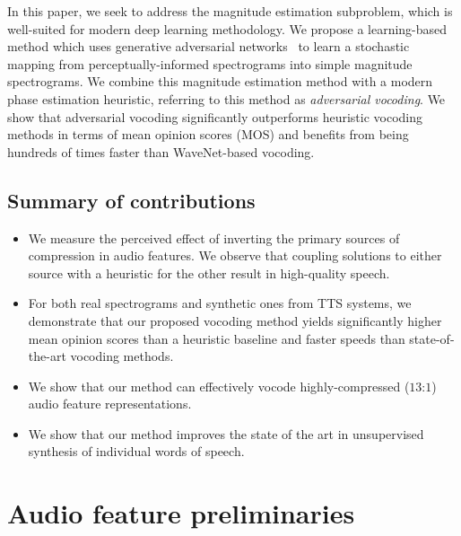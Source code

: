 \documentclass[a4paper]{article}
\begin{document}
In this paper, 
we seek to address the magnitude estimation subproblem, 
which is well-suited for modern deep learning methodology. 
We propose a learning-based method which uses generative adversarial networks~\cite{goodfellow2014generative} to learn a stochastic mapping from perceptually-informed spectrograms into simple magnitude spectrograms. 
We combine this magnitude estimation method with a modern phase estimation heuristic, 
referring to this method as \emph{adversarial vocoding}.
We show that adversarial vocoding significantly outperforms heuristic vocoding methods in terms of mean opinion scores (MOS) and benefits from being hundreds of times faster than WaveNet-based vocoding.

\subsection{Summary of contributions}

\begin{itemize}
    \item We measure the perceived effect of inverting the primary sources of compression in audio features. We observe that coupling solutions to either source with a heuristic for the other result in high-quality speech.
    \item For both real spectrograms and synthetic ones from TTS systems, we demonstrate that our proposed vocoding method yields significantly higher mean opinion scores
    than a heuristic baseline and faster speeds than state-of-the-art vocoding methods.
    \item We show that our method can effectively vocode highly-compressed ($13$:$1$) audio feature representations.
    \item We show that our method improves the state of the art in unsupervised synthesis of individual words of speech.
\end{itemize}

\section{Audio feature preliminaries}
\end{document}
